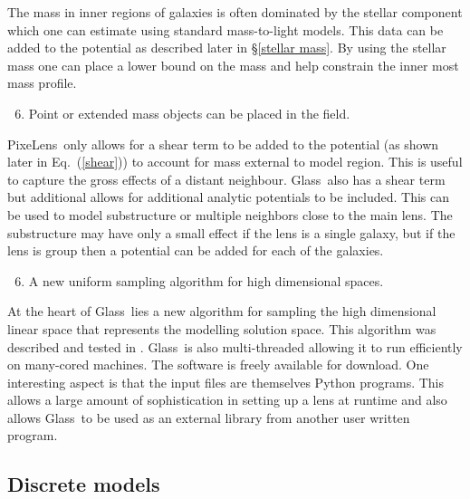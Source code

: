 \documentclass[galley,usenatbib]{mn2e}
\newcommand{\Glass}{{\sc Glass}}
\newcommand{\PixeLens}{{\sc PixeLens}}
\newcommand{\eqnref}[1] {Eq.~(\ref{#1})}
\newcommand{\secref}[1] {\S\ref{#1}}
\begin{document}
%
The mass in inner regions of galaxies is often dominated by the stellar component
which one can estimate using standard mass-to-light models. This data can be added
to the potential as described later in \secref{stellar mass}. By using the stellar
mass one can place a lower bound on the mass and help constrain the inner most
mass profile.
%
\begin{enumerate}
  \setcounter{enumi}{5}
  \item Point or extended mass objects can be placed in the field.
\end{enumerate}
%
\PixeLens\ only allows for a shear term to be added to the potential (as shown
later in \eqnref{shear}) to account for mass external to model region. This
is useful to capture the gross effects of a distant neighbour. \Glass\ also
has a shear term but additional allows for additional analytic potentials to
be included. This can be used to model substructure or multiple neighbors close
to the main lens. The substructure may have only a small effect if the lens is
a single galaxy, but if the lens is group then a potential can be added for
each of the galaxies.
%
\begin{enumerate}
  \setcounter{enumi}{5}
  \item A new uniform sampling algorithm for high dimensional spaces.
\end{enumerate}
%
At the heart of \Glass\ lies a new algorithm for sampling the high dimensional
linear space that represents the modelling solution space. This algorithm was
described and tested in \cite{}. \Glass\ is also multi-threaded allowing it to
run efficiently on many-cored machines.  The software is freely available for
download. One interesting aspect is that the input files are themselves Python
programs. This allows a large amount of sophistication in setting up a lens at
runtime and also allows \Glass\ to be used as an external library from another
user written program.

\subsection{Discrete models}
\end{document}
